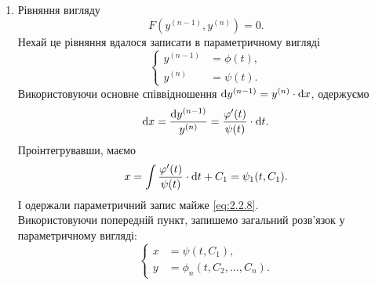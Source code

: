 \begin{enumerate}
\item Рівняння вигляду
\begin{equation}
	\label{eq:2.2.10}
	F \left( y^{(n-1)}, y^{(n)} \right) = 0.
\end{equation}
Нехай це рівняння вдалося записати в параметричному вигляді 
\begin{equation}
	\label{eq:2.2.11}
	\left\{
		\begin{aligned}
			y^{(n-1)} &= \phi(t), \\
			y^{(n)} &= \psi(t).
		\end{aligned}
	\right.
\end{equation}
Використовуючи основне співвідношення $\mathop{}\!\mathrm{d} y^{(n-1)} = y^{(n)} \cdot \mathop{}\!\mathrm{d} x$, одержуємо
\begin{equation}
	\label{eq:2.2.12}
	\mathop{}\!\mathrm{d} x = \frac{\mathop{}\!\mathrm{d} y^{(n-1)}}{y^{(n)}} = \frac{\varphi'(t)}{\psi(t)} \cdot \mathop{}\!\mathrm{d} t.
\end{equation}
Проінтегрувавши, маємо
\begin{equation}
	\label{eq:2.2.13}
	x = \int \frac{\varphi'(t)}{\psi(t)} \cdot \mathop{}\!\mathrm{d} t + C_1 = \psi_1(t, C_1).
\end{equation}
І одержали параметричний запис майже \eqref{eq:2.2.8}. \\

Використовуючи попередній пункт, запишемо загальний розв’язок у параметричному вигляді:
\begin{equation}
	\label{eq:2.2.14}
	\left\{
		\begin{aligned}
			x &= \psi(t, C_1), \\
			y &= \phi_n(t, C_2, \ldots, C_n).
		\end{aligned}
	\right.
\end{equation}
 

\end{enumerate}
